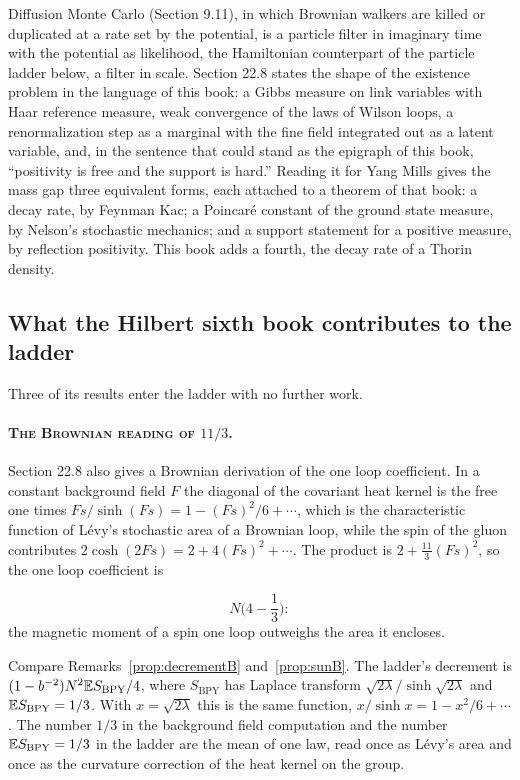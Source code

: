 Diffusion Monte Carlo (Section 9.11), in which Brownian walkers are killed or duplicated at a rate set by the potential, is a particle filter in imaginary time with the potential as likelihood, the Hamiltonian counterpart of the particle ladder below, a filter in scale. Section 22.8 states the shape of the existence problem in the language of this book: a Gibbs measure on link variables with Haar reference measure, weak convergence of the laws of Wilson loops, a renormalization step as a marginal with the fine field integrated out as a latent variable, and, in the sentence that could stand as the epigraph of this book, ``positivity is free and the support is hard.''  Reading it for Yang Mills gives the mass gap three equivalent forms, each attached to a theorem of that book: a decay rate, by Feynman Kac; a Poincar\'e constant of the ground state measure, by Nelson's stochastic mechanics; and a support statement for a positive measure, by reflection positivity. This book adds a fourth, the decay rate of a Thorin density.

\subsection{What the Hilbert sixth book contributes to the ladder}\label{ch:h6}

Three of its results enter the ladder with no further work.

\paragraph{\normalfont\scshape The Brownian reading of $11/3$.}
Section 22.8 also gives a Brownian derivation of the one loop coefficient. In a constant background field $F$ the diagonal of the covariant heat kernel is the free one times $Fs/\sinh(Fs)=1-(Fs)^2/6+\cdots$, which is the characteristic function of L\'evy's stochastic area of a Brownian loop, while the spin of the gluon contributes $2\cosh(2Fs)=2+4(Fs)^2+\cdots$. The product is $2+\frac{11}{3}(Fs)^2$, so the one loop coefficient is

\[
N\Big(4-\frac13\Big):
\]
the magnetic moment of a spin one loop outweighs the area it encloses.

Compare Remarks~\ref{prop:decrementB} and~\ref{prop:sunB}. The ladder's decrement is $(1-b^{-2})N^2\mathbb{E} S_{\mathrm{BPY}}/4$, where $S_{\mathrm{BPY}}$ has Laplace transform $\sqrt{2\lambda}/\sinh\sqrt{2\lambda}$ and $\mathbb{E} S_{\mathrm{BPY}}=1/3$. With $x=\sqrt{2\lambda}$ this is the same function, $x/\sinh x=1-x^2/6+\cdots$. The number $1/3$ in the background field computation and the number $\mathbb{E} S_{\mathrm{BPY}}=1/3$ in the ladder are the mean of one law, read once as L\'evy's area and once as the curvature correction of the heat kernel on the group.

